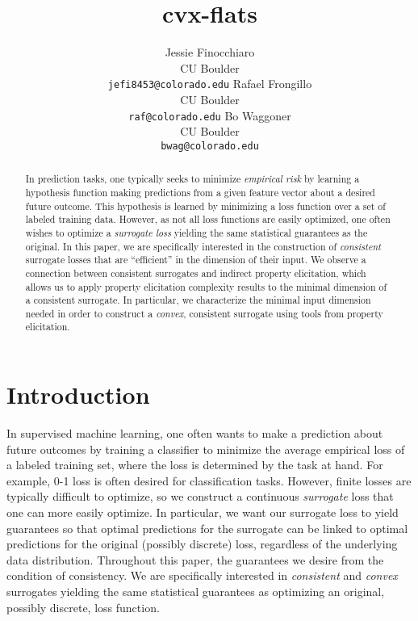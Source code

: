 \documentclass{article}
\title{cvx-flats}
\author{%
  Jessie Finocchiaro\\
  CU Boulder\\
  \texttt{jefi8453@colorado.edu} 
  \And
   Rafael Frongillo\\
   CU Boulder\\
   \texttt{raf@colorado.edu} 
   \And
   Bo Waggoner\\
   CU Boulder \\
   \texttt{bwag@colorado.edu} 
}
\begin{document}
\maketitle

\begin{abstract}
	In prediction tasks, one typically seeks to minimize \emph{empirical risk} by learning a hypothesis function making predictions from a given feature vector about a desired future outcome.
	This hypothesis is learned by minimizing a loss function over a set of labeled training data.
	However, as not all loss functions are easily optimized, one often wishes to optimize a \emph{surrogate loss} yielding the same statistical guarantees as the original.
	In this paper, we are specifically interested in the construction of \emph{consistent} surrogate losses that are ``efficient'' in the dimension of their input.
	We observe a connection between consistent surrogates and indirect property elicitation, which allows us to apply property elicitation complexity results to the minimal dimension of a consistent surrogate.
	In particular, we characterize the minimal input dimension needed in order to construct a \emph{convex}, consistent surrogate using tools from property elicitation.
\end{abstract}

\section{Introduction}\label{sec:intro}

In supervised machine learning, one often wants to make a prediction about future outcomes by training a classifier to minimize the average empirical loss of a labeled training set, where the loss is determined by the task at hand.
For example, 0-1 loss is often desired for classification tasks.
However, finite losses are typically difficult to optimize, so we construct a continuous \emph{surrogate} loss that one can more easily optimize.
In particular, we want our surrogate loss to yield guarantees so that optimal predictions for the surrogate can be linked to optimal predictions for the original (possibly discrete) loss, regardless of the underlying data distribution. 
Throughout this paper, the guarantees we desire from the condition of consistency.
We are specifically interested in \emph{consistent} and \emph{convex} surrogates yielding the same statistical guarantees as optimizing an original, possibly discrete, loss function. 
\end{document}
